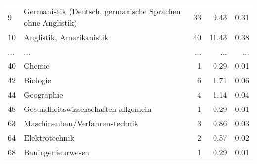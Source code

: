 \begin{longtable}{lXrrr}
        9 & \multicolumn{1}{X}{Germanistik (Deutsch, germanische Sprachen ohne Anglistik)} & %
          \num{33} &
          \num[round-mode=places,round-precision=2]{9,43} &
          \num[round-mode=places,round-precision=2]{0,31} \\
        10 & \multicolumn{1}{X}{Anglistik, Amerikanistik} & %
          \num{40} &
          \num[round-mode=places,round-precision=2]{11,43} &
          \num[round-mode=places,round-precision=2]{0,38} \\
       ... & ... & ... & ... & ... \\
        40 & \multicolumn{1}{X}{Chemie} & %
          \num{1} &
          \num[round-mode=places,round-precision=2]{0,29} &
          \num[round-mode=places,round-precision=2]{0,01} \\

        42 & \multicolumn{1}{X}{Biologie} & %
          \num{6} &
          \num[round-mode=places,round-precision=2]{1,71} &
          \num[round-mode=places,round-precision=2]{0,06} \\

        44 & \multicolumn{1}{X}{Geographie} & %
          \num{4} &
          \num[round-mode=places,round-precision=2]{1,14} &
          \num[round-mode=places,round-precision=2]{0,04} \\

        48 & \multicolumn{1}{X}{Gesundheitswissenschaften allgemein} & %
          \num{1} &
          \num[round-mode=places,round-precision=2]{0,29} &
          \num[round-mode=places,round-precision=2]{0,01} \\

        63 & \multicolumn{1}{X}{Maschinenbau/Verfahrenstechnik} & %
          \num{3} &
          \num[round-mode=places,round-precision=2]{0,86} &
          \num[round-mode=places,round-precision=2]{0,03} \\

        64 & \multicolumn{1}{X}{Elektrotechnik} & %
          \num{2} &
          \num[round-mode=places,round-precision=2]{0,57} &
          \num[round-mode=places,round-precision=2]{0,02} \\

        68 & \multicolumn{1}{X}{Bauingenieurwesen} & %
          \num{1} &
          \num[round-mode=places,round-precision=2]{0,29} &
          \num[round-mode=places,round-precision=2]{0,01} \\


\end{longtable}

